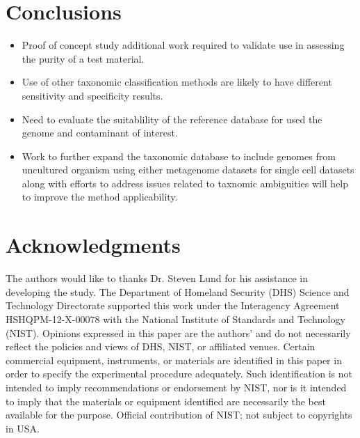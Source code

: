 \documentclass[fleqn,10pt,lineno]{wlpeerj}\usepackage[]{graphicx}\usepackage[]{color}
\begin{document}
\section*{Conclusions}  
\begin{itemize}
      \item Proof of concept study additional work required to validate use in assessing the purity of a test material.  
      \item Use of other taxonomic classification methods are likely to have different sensitivity and specificity results.
      \item Need to evaluate the suitablility of the reference database for used the genome and contaminant of interest.
      \item Work to further expand the taxonomic database to include genomes from uncultured organism using either metagenome datasets for single cell datasets along with efforts to address issues related to taxnomic ambiguities will help to improve the method applicability. 
\end{itemize}


\section*{Acknowledgments}

The authors would like to thanks Dr. Steven Lund for his assistance in developing the study. 
The Department of Homeland Security (DHS) Science and Technology Directorate supported this work under the Interagency Agreement HSHQPM-12-X-00078 with the National Institute of Standards and Technology (NIST). 
Opinions expressed in this paper are the authors’ and do not necessarily reflect the policies and views of DHS,  NIST, or affiliated venues. 
Certain commercial equipment, instruments, or materials are identified in this paper in order to specify the experimental procedure adequately. 
Such identification is not intended to imply recommendations or endorsement by NIST, 
nor is it intended to imply that the materials or equipment identified are necessarily the best available for the purpose. 
Official contribution of NIST; not subject to copyrights in USA.


\end{document}
